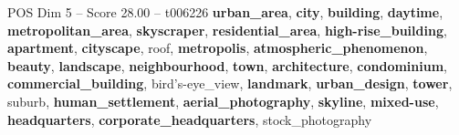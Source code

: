 \begin{textsample}{POS Dim 5 – Score 28.00 – t006226}  \label{ex:f5_pos_003}
\textbf{urban\_area}, \textbf{city}, \textbf{building}, \textbf{daytime}, \textbf{metropolitan\_area}, \textbf{skyscraper}, \textbf{residential\_area}, \textbf{high-rise\_building}, \textbf{apartment}, \textbf{cityscape}, roof, \textbf{metropolis}, \textbf{atmospheric\_phenomenon}, \textbf{beauty}, \textbf{landscape}, \textbf{neighbourhood}, \textbf{town}, \textbf{architecture}, \textbf{condominium}, \textbf{commercial\_building}, bird's-eye\_view, \textbf{landmark}, \textbf{urban\_design}, \textbf{tower}, suburb, \textbf{human\_settlement}, \textbf{aerial\_photography}, \textbf{skyline}, \textbf{mixed-use}, \textbf{headquarters}, \textbf{corporate\_headquarters}, stock\_photography

\end{textsample}
